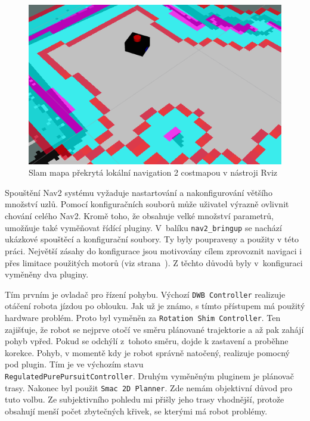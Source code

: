 \begin{figure}[h!]
	\centering
	\includegraphics[scale=0.7]{obrazky-figures/nav2.png}
	\caption{Slam mapa překrytá lokální navigation 2 costmapou v nástroji Rviz}
	\label{fig:rviz_costmap}
\end{figure}

Spouštění Nav2 systému vyžaduje nastartování a nakonfigurování většího množství uzlů. Pomocí konfiguračních souborů může uživatel výrazně ovlivnit chování celého Nav2. Kromě toho, že obsahuje velké množství parametrů, umožňuje také vyměňovat řídící pluginy. V~balíku \verb|nav2_bringup| se nachází ukázkové spouštěcí a konfigurační soubory. Ty byly poupraveny a použity v této práci. Největší zásahy do konfigurace jsou motivovány cílem zprovoznit navigaci i přes limitace použitých motorů (viz strana~\pageref{implementation:motors}). Z těchto důvodů byly v~konfiguraci vyměněny dva pluginy. 

Tím prvním je ovladač pro řízení pohybu. Výchozí \verb|DWB Controller| realizuje otáčení robota jízdou po oblouku. Jak už je známo, s tímto přístupem má použitý hardware problém. Proto byl vyměněn za \verb|Rotation Shim Controller|. Ten zajišťuje, že robot se nejprve otočí ve směru plánované trajektorie a až pak zahájí pohyb vpřed. Pokud se odchýlí z~tohoto směru, dojde k zastavení a proběhne korekce. Pohyb, v momentě kdy je robot správně natočený, realizuje pomocný pod plugin. Tím je ve výchozím stavu \\ \verb|RegulatedPurePursuitController|. Druhým vyměněným pluginem je plánovač trasy. Nakonec byl použit \verb|Smac 2D Planner|. Zde nemám objektivní důvod pro tuto volbu. Ze subjektivního pohledu mi přišly jeho trasy vhodnější, protože obsahují menší počet zbytečných křivek, se kterými má robot problémy.

